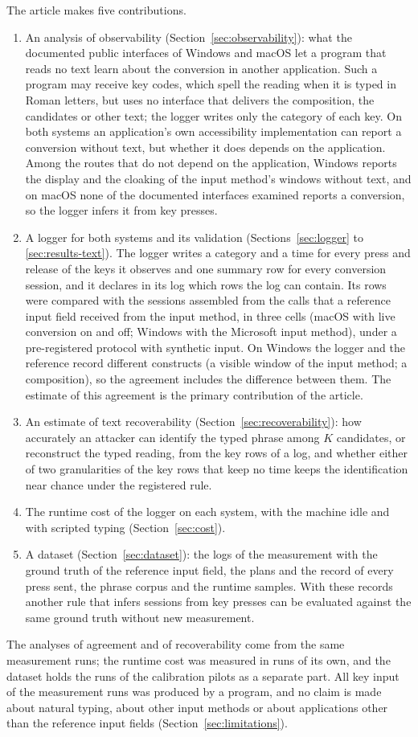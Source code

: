 The article makes five contributions.
\begin{enumerate}
\item An analysis of observability (Section~\ref{sec:observability}): what the documented public interfaces of
Windows and macOS let a program that reads no text learn about the conversion in another application. Such a program
may receive key codes, which spell the reading when it is typed in Roman letters, but uses no interface that delivers
the composition, the candidates or other text; the logger writes only the category of each key. On both systems an
application's own accessibility implementation can report a conversion without text, but whether it does depends on the
application. Among the routes that do not depend on the application, Windows reports the display and the cloaking of
the input method's windows without text, and on macOS none of the documented interfaces examined reports a conversion,
so the logger infers it from key presses.
\item A logger for both systems and its validation (Sections~\ref{sec:logger} to \ref{sec:results-text}). The logger
writes a category and a time for every press and release of the keys it observes and one summary row for every
conversion session, and it declares in its log which rows the log can contain. Its rows were compared with the
sessions assembled from the calls that a reference input field received from the input method, in three cells (macOS
with live conversion on and off; Windows with the Microsoft input method), under a pre-registered protocol with
synthetic input. On Windows the logger and the reference record different constructs (a visible window of the input
method; a composition), so the agreement includes the difference between them. The estimate of this agreement is the
primary contribution of the article.
\item An estimate of text recoverability (Section~\ref{sec:recoverability}): how accurately an attacker can identify
the typed phrase among $K$ candidates, or reconstruct the typed reading, from the key rows of a log, and whether either
of two granularities of the key rows that keep no time keeps the identification near chance under the registered rule.
\item The runtime cost of the logger on each system, with the machine idle and with scripted typing
(Section~\ref{sec:cost}).
\item A dataset (Section~\ref{sec:dataset}): the logs of the measurement with the ground truth of the reference input
field, the plans and the record of every press sent, the phrase corpus and the runtime samples. With these records
another rule that infers sessions from key presses can be evaluated against the same ground truth without new
measurement.
\end{enumerate}

The analyses of agreement and of recoverability come from the same measurement runs; the runtime cost was measured in
runs of its own, and the dataset holds the runs of the calibration pilots as a separate part. All key input of the
measurement runs was produced by a program, and no claim is made about natural typing, about other input methods or
about applications other than the reference input fields (Section~\ref{sec:limitations}).
